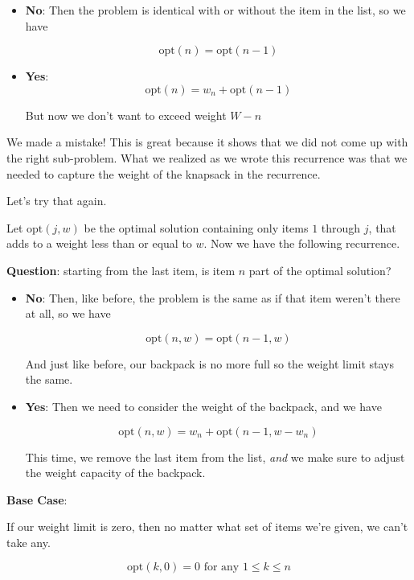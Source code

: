 \documentclass[12pt]{article}
\def\opt{\text{opt}}
\begin{document}
  \begin{itemize}
    \item {\bf No}: Then the problem is identical with or without the item in
      the list, so we have

      \[
        \opt(n) = \opt(n - 1)
      \]

    \item {\bf Yes}:
      \[
        \opt(n) = w_n + \opt(n - 1)
      \]

      But now we don't want to exceed weight $W - n$
  \end{itemize}

  We made a mistake! This is great because it shows that we did not come up with
  the right sub-problem. What we realized as we wrote this recurrence was that
  we needed to capture the weight of the knapsack in the recurrence.

  Let's try that again.

  Let $\opt(j, w)$ be the optimal solution containing only items $1$ through
  $j$, that adds to a weight less than or equal to $w$. Now we have the
  following recurrence.

  {\bf Question}: starting from the last item, is item $n$ part of the optimal
  solution?

  \begin{itemize}
    \item {\bf No}: Then, like before, the problem is the same as if that item
      weren't there at all, so we have

      \[
        \opt(n, w) = \opt(n - 1, w)
      \]

      And just like before, our backpack is no more full so the weight limit
      stays the same.

    \item {\bf Yes}: Then we need to consider the weight of the backpack, and we
      have

      \[
        \opt(n, w) = w_n + \opt(n - 1, w - w_n)
      \]

      This time, we remove the last item from the list, {\it and} we make sure
      to adjust the weight capacity of the backpack.

  \end{itemize}

  {\bf Base Case}:

  If our weight limit is zero, then no matter what set of items we're given, we
  can't take any.

  \[
    \opt(k, 0) = 0 \text{ for any $1 \le k \le n$}
  \]
\end{document}

